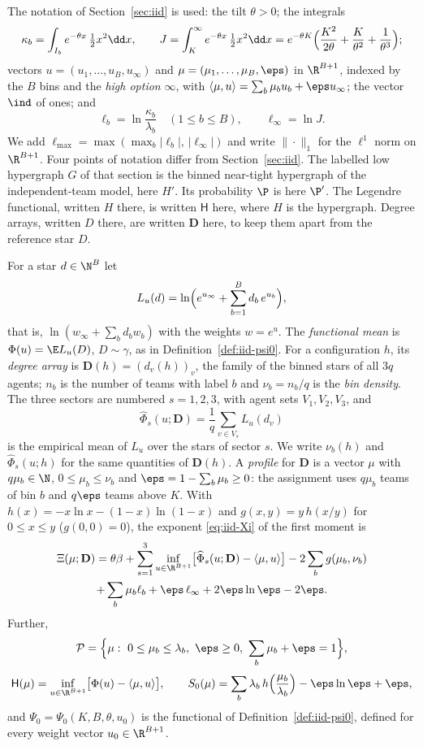 The notation of Section~\ref{sec:iid} is used: the tilt $\theta>0$; the integrals
\[
\kappa_b=\int_{I_b}e^{-\theta x}\,\tfrac12x^2\dd x,\qquad
J=\int_K^\infty e^{-\theta x}\,\tfrac12x^2\dd x
=e^{-\theta K}\Bigl(\frac{K^2}{2\theta}+\frac{K}{\theta^2}+\frac{1}{\theta^3}\Bigr);
\]
vectors $u=(u_1,\dots,u_B,u_\infty)$ and $\mu=(\mu_1,\dots,\mu_B,\eps)$ in $\R^{B+1}$, indexed
by the $B$ bins and the \emph{high option} $\infty$, with
$\langle\mu,u\rangle=\sum_b\mu_bu_b+\eps u_\infty$; the vector $\ind$ of ones; and
\[
\ell_b=\ln\frac{\kappa_b}{\lambda_b}\quad(1\le b\le B),\qquad \ell_\infty=\ln J .
\]
We add $\ell_{\max}=\max(\max_b|\ell_b|,\,|\ell_\infty|)$ and write $\|\cdot\|_1$ for the
$\ell^1$ norm on $\R^{B+1}$. Four points of notation differ from Section~\ref{sec:iid}. The
labelled low hypergraph $G$ of that section is the binned near-tight hypergraph of the
independent-team model, here $H'$. Its probability $\P$ is here $\P'$. The Legendre
functional, written $H$ there, is written $\mathsf H$ here, where $H$ is the hypergraph.
Degree arrays, written $D$ there, are written $\mathbf D$ here, to keep them apart from the
reference star $D$.

For a star $d\in\N^B$ let
\[
L_u(d)=\ln\Bigl(e^{u_\infty}+\sum_{b=1}^Bd_b\,e^{u_b}\Bigr),
\]
that is, $\ln(w_\infty+\sum_bd_bw_b)$ with the weights $w=e^u$. The \emph{functional mean} is
$\Phi(u)=\E L_u(D)$, $D\sim\gamma$, as in Definition~\ref{def:iid-psi0}. For a configuration
$h$, its \emph{degree array} is $\mathbf D(h)=(d_v(h))_v$, the family of the binned stars of
all $3q$ agents; $n_b$ is the number of teams with label $b$ and $\nu_b=n_b/q$ is the
\emph{bin density}. The three sectors are numbered $s=1,2,3$, with agent sets $V_1,V_2,V_3$,
and
\[
\widehat\Phi_s(u;\mathbf D)=\frac1q\sum_{v\in V_s}L_u(d_v)
\]
is the empirical mean of $L_u$ over the stars of sector $s$. We write $\nu_b(h)$ and
$\widehat\Phi_s(u;h)$ for the same quantities of $\mathbf D(h)$. A \emph{profile} for
$\mathbf D$ is a vector $\mu$ with $q\mu_b\in\N$, $0\le\mu_b\le\nu_b$ and
$\eps=1-\sum_b\mu_b\ge0$: the assignment uses $q\mu_b$ teams of bin $b$ and $q\eps$ teams above
$K$. With $h(x)=-x\ln x-(1-x)\ln(1-x)$ and $g(x,y)=y\,h(x/y)$ for $0\le x\le y$
($g(0,0)=0$), the exponent \eqref{eq:iid-Xi} of the first moment is
\begin{multline}\label{eq:transfer-Xi}
\Xi(\mu;\mathbf D)=\theta\beta+\sum_{s=1}^3\inf_{u\in\R^{B+1}}\bigl[\widehat\Phi_s(u;\mathbf D)-\langle\mu,u\rangle\bigr]
-2\sum_bg(\mu_b,\nu_b)\\
+\sum_b\mu_b\ell_b+\eps\,\ell_\infty+2\eps\ln\eps-2\eps .
\end{multline}
Further,
\[
\mathcal P=\Bigl\{\mu:\ 0\le\mu_b\le\lambda_b,\ \eps\ge0,\ \sum_b\mu_b+\eps=1\Bigr\},
\]
\[
\mathsf H(\mu)=\inf_{u\in\R^{B+1}}\bigl[\Phi(u)-\langle\mu,u\rangle\bigr],\qquad
S_0(\mu)=\sum_b\lambda_b\,h\Bigl(\frac{\mu_b}{\lambda_b}\Bigr)-\eps\ln\eps+\eps ,
\]
and $\Psi_0=\Psi_0(K,B,\theta,u_0)$ is the functional of Definition~\ref{def:iid-psi0},
defined for every weight vector $u_0\in\R^{B+1}$.

